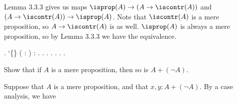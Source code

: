  \soln
Lemma 3.3.3 gives us maps $\isprop(A) \to (A \to \iscontr(A))$ and $(A
\to \iscontr(A)) \to \isprop(A)$.  Note that $\iscontr(A)$ is a mere
proposition, so $A \to \iscontr(A)$ is as well.  $\isprop(A)$ is
always a mere proposition, so by Lemma 3.3.3 we have the equivalence.
\begin{coqdoccode}
\coqdocemptyline
\coqdocnoindent
{} .\coqdoceol
\coqdocemptyline
\coqdocnoindent
{}  `\{\} ( : ) \coqdoceol
\coqdocindent{1.00em}
:   \coqdocnotation{\ensuremath{\eqvsym}} \coqdocnotation{(}   \coqdocnotation{)}.\coqdoceol
\coqdocnoindent
{}.\coqdoceol
\coqdocindent{1.00em}
 .\coqdoceol
\coqdocindent{1.00em}
 .\coqdoceol
\coqdocindent{1.00em}
 .\coqdoceol
\coqdocnoindent
{}.\coqdoceol
\coqdocemptyline
\coqdocnoindent
{} .\coqdoceol
\coqdocemptyline
\end{coqdoccode}
Show that if $A$ is a mere proposition, then so is $A + (\lnot A)$.


 \soln
Suppose that $A$ is a mere proposition, and that $x, y : A + (\lnot A)$.  By a
case analysis, we have



